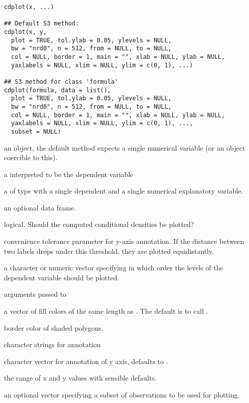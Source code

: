 %
\begin{Usage}
\begin{verbatim}
cdplot(x, ...)

## Default S3 method:
cdplot(x, y,
  plot = TRUE, tol.ylab = 0.05, ylevels = NULL,
  bw = "nrd0", n = 512, from = NULL, to = NULL,
  col = NULL, border = 1, main = "", xlab = NULL, ylab = NULL,
  yaxlabels = NULL, xlim = NULL, ylim = c(0, 1), ...)

## S3 method for class 'formula'
cdplot(formula, data = list(),
  plot = TRUE, tol.ylab = 0.05, ylevels = NULL,
  bw = "nrd0", n = 512, from = NULL, to = NULL,
  col = NULL, border = 1, main = "", xlab = NULL, ylab = NULL,
  yaxlabels = NULL, xlim = NULL, ylim = c(0, 1), ...,
  subset = NULL)
\end{verbatim}
\end{Usage}
%
\begin{Arguments}
\begin{ldescription}
\item[\code{x}] an object, the default method expects a single numerical
variable (or an object coercible to this).
\item[\code{y}] a  interpreted to be the dependent variable
\item[\code{formula}] a  of type  with a single dependent
 and a single numerical explanatory variable.   
\item[\code{data}] an optional data frame.
\item[\code{plot}] logical. Should the computed conditional densities be plotted?
\item[\code{tol.ylab}] convenience tolerance parameter for y-axis annotation.
If the distance between two labels drops under this threshold, they are
plotted equidistantly.
\item[\code{ylevels}] a character or numeric vector specifying in which order
the levels of the dependent variable should be plotted.
\item[\code{bw, n, from, to, ...}] arguments passed to 
\item[\code{col}] a vector of fill colors of the same length as .
The default is to call . 
\item[\code{border}] border color of shaded polygons. 
\item[\code{main, xlab, ylab}] character strings for annotation
\item[\code{yaxlabels}] character vector for annotation of y axis, defaults to
.
\item[\code{xlim, ylim}] the range of x and y values with sensible defaults.
\item[\code{subset}] an optional vector specifying a subset of observations
to be used for plotting.
\end{ldescription}
\end{Arguments}
